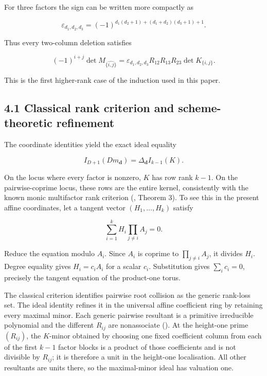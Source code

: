 \documentclass[
  11pt,
  a4paper,
]{article}
\begin{document}
For three factors the sign can be written more compactly as

\[
 \varepsilon_{d_1,d_2,d_3}
 =(-1)^{d_1(d_2+1)+(d_1+d_2)(d_3+1)+1}.
\]

Thus every two-column deletion satisfies

\[
 (-1)^{i+j}\det M_{\widehat{\{i,j\}}}
 =\varepsilon_{d_1,d_2,d_3}R_{12}R_{13}R_{23}\det K_{\{i,j\}}.
\]

This is the first higher-rank case of the induction used in this paper.

\subsection{4.1 Classical rank criterion and scheme-theoretic
refinement}\label{classical-rank-criterion-and-scheme-theoretic-refinement}

The coordinate identities yield the exact ideal equality

\[
 \boxed{
 I_{D+1}(Dm_{\mathbf d})
 =\Delta_{\mathbf d}I_{k-1}(K).
 }
\]

On the locus where every factor is nonzero, \(K\) has row rank \(k-1\).
On the pairwise-coprime locus, these rows are the entire kernel,
consistently with the known monic multifactor rank criterion
(, Theorem 3). To see this in the present affine coordinates, let a
tangent vector \((H_1,\ldots,H_k)\) satisfy

\[
 \sum_{i=1}^kH_i\prod_{j\ne i}A_j=0.
\]

Reduce the equation modulo \(A_i\). Since \(A_i\) is coprime to
\(\prod_{j\ne i}A_j\), it divides \(H_i\). Degree equality gives
\(H_i=c_iA_i\) for a scalar \(c_i\). Substitution gives
\(\sum_i c_i=0\), precisely the tangent equation of the product-one
torus.

The classical criterion identifies pairwise root collision as the
generic rank-loss set. The ideal identity refines it in the universal
affine coefficient ring by retaining every maximal minor. Each generic
pairwise resultant is a primitive irreducible polynomial and the
different \(R_{ij}\) are nonassociate
(). At the height-one prime
\((R_{ij})\), the \(K\)-minor obtained by choosing one fixed coefficient
column from each of the first \(k-1\) factor blocks is a product of
those coefficients and is not divisible by \(R_{ij}\); it is therefore a
unit in the height-one localisation. All other resultants are units
there, so the maximal-minor ideal has valuation one.
\end{document}
